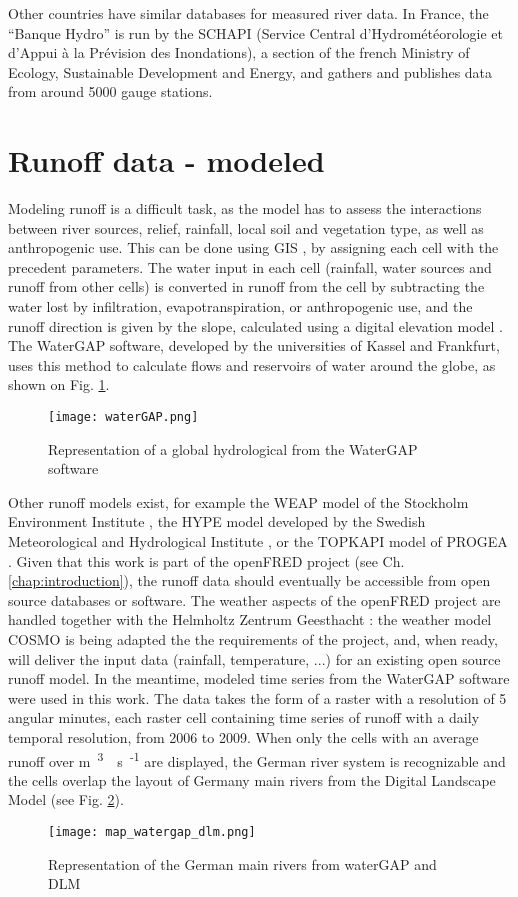 Other countries have similar databases for measured river data. In France, the ``Banque Hydro'' is run by the SCHAPI (Service Central d'Hydrométéorologie et d'Appui à la Prévision des Inondations), a section of the french Ministry of Ecology, Sustainable Development and Energy, and gathers and publishes data from around 5000 gauge stations.

\section{Runoff data - modeled}

\label{sec:mod_runoff}
Modeling runoff is a difficult task, as the model has to assess the interactions between river sources, relief, rainfall, local soil and vegetation type, as well as anthropogenic use. This can be done using GIS \cite{bayazit}, by assigning each cell with the precedent parameters. The water input in each cell (rainfall, water sources and runoff from other cells) is converted in runoff from the cell by subtracting the water lost by infiltration, evapotranspiration, or anthropogenic use, and the runoff direction is given by the slope, calculated using a digital elevation model \cite{heywood}. \newline
The WaterGAP software, developed by the universities of Kassel and Frankfurt, uses this method to calculate flows and reservoirs of water around the globe, as shown on Fig. \ref{waterGAP}.
\begin{figure}[H]
\centering
\texttt{[image: waterGAP.png]}
\caption[Representation of a global hydrological from the WaterGAP software]{Representation of a global hydrological from the WaterGAP software \cite{doll}}
\label{waterGAP}
\end{figure}
Other runoff models exist, for example the WEAP model of the Stockholm Environment Institute \cite{weap}, the HYPE model developed by the Swedish Meteorological and Hydrological Institute \cite{hype}, or the TOPKAPI model of PROGEA \cite{topkapi}. \newline
Given that this work is part of the openFRED project (see Ch. \ref{chap:introduction}), the runoff data should eventually be accessible from open source databases or software. The weather aspects of the openFRED project are handled together with the Helmholtz Zentrum Geesthacht : the weather model COSMO is being adapted the the requirements of the project, and, when ready, will deliver the input data (rainfall, temperature, ...) for an existing open source runoff model. \newline
In the meantime, modeled time series from the WaterGAP software were used in this work. The data takes the form of a raster with a resolution of 5 angular minutes, each raster cell containing time series of runoff with a daily temporal resolution, from 2006 to 2009. When only the cells with an average runoff over \unit[100]{m\textsuperscript{3}\textperiodcentered s\textsuperscript{-1}} are displayed, the German river system is recognizable and the cells overlap the layout of Germany main rivers from the Digital Landscape Model \cite{dlm250} (see Fig. \ref{map_watergap_dlm}).

\begin{figure}[H]
\centering
\texttt{[image: map\_watergap\_dlm.png]}
\caption[Representation of the German main rivers from waterGAP and DLM]{Representation of the German main rivers from waterGAP and DLM}
\label{map_watergap_dlm}
\end{figure}
